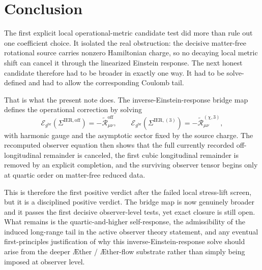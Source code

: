 \documentclass[11pt]{article}
\newcommand{\Aether}{\AE{}ther}
\newcommand{\Aflow}{\AE{}ther-flow}
\newcommand{\ReBridge}{g^{\mathrm{br}}}
\newcommand{\SigmaOff}{\Sigma^{\mathrm{IER,off}}}
\newcommand{\SigmaLongThree}{\Sigma^{\mathrm{IER},(3)}}
\newcommand{\ReOff}{\widetilde{\mathcal R}_{\mu\nu}^{\mathrm{off}}}
\newcommand{\ReLongThree}{\widetilde{\mathcal R}_{\mu\nu}^{(\chi,3)}}
\newcommand{\EinLin}{\mathcal E_{\ReBridge}}
\begin{document}
\section{Conclusion}

The first explicit local operational-metric candidate test did more than rule out one coefficient choice. It isolated the real obstruction: the decisive matter-free rotational source carries nonzero Hamiltonian charge, so no decaying local metric shift can cancel it through the linearized Einstein response. The next honest candidate therefore had to be broader in exactly one way. It had to be solve-defined and had to allow the corresponding Coulomb tail.

That is what the present note does. The inverse-Einstein-response bridge map defines the operational correction by solving
\[
\EinLin(\SigmaOff)=-\ReOff,
\qquad
\EinLin(\SigmaLongThree)=-\ReLongThree,
\]
with harmonic gauge and the asymptotic sector fixed by the source charge. The recomputed observer equation then shows that the full currently recorded off-longitudinal remainder is canceled, the first cubic longitudinal remainder is removed by an explicit completion, and the surviving observer tensor begins only at quartic order on matter-free reduced data.

This is therefore the first positive verdict after the failed local stress-lift screen, but it is a disciplined positive verdict. The bridge map is now genuinely broader and it passes the first decisive observer-level tests, yet exact closure is still open. What remains is the quartic-and-higher self-response, the admissibility of the induced long-range tail in the active observer theory statement, and any eventual first-principles justification of why this inverse-Einstein-response solve should arise from the deeper \Aether{} / \Aflow{} substrate rather than simply being imposed at observer level.
\end{document}

